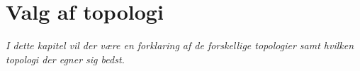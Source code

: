 \chapter{Valg af topologi}\label{kap:topologi}

\emph{I dette kapitel vil der være en forklaring af de forskellige topologier samt hvilken topologi der egner sig bedst.}